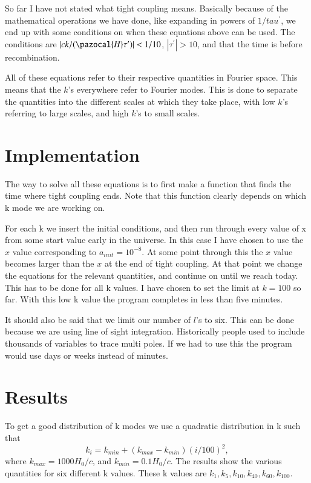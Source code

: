 \documentclass[a4paper]{report}
\begin{document}
So far I have not stated what tight coupling means. Basically because of the mathematical operations we have done, like expanding in powers of $1/tau^\prime$, we end up with some conditions on when these equations above can be used. The conditions are $|ck/(\pazocal{H}\tau^\prime)| < 1/10$, $|\tau^\prime|>10$, and that the time is before recombination.
 
All of these equations refer to their respective quantities in Fourier space. This means that the $k$'s everywhere refer to Fourier modes. This is done to separate the quantities into the different scales at which they take place, with low $k$'s referring to large scales, and high $k$'s to small scales.
 
\section{Implementation}\label{sec:Imp}
The way to solve all these equations is to first make a function that finds the time where tight coupling ends.
Note that this function clearly depends on which k mode we are working on.

For each k we insert the initial conditions, and then run through every value of x from some start value early in the universe. In this case I have chosen to use the $x$ value corresponding to $a_{init} = 10^{-8}$.
At some point through this the $x$ value becomes larger than the $x$ at the end of tight coupling. At that point we change the equations for the relevant quantities, and continue on until we reach today.
This has to be done for all k values. I have chosen to set the limit at $k=100$ so far. With this low k value the program completes in less than five minutes.

It should also be said that we limit our number of $l$'s to six. This can be done because we are using line of sight integration. Historically people used to include thousands of variables to trace multi poles. If we had to use this the program would use days or weeks instead of minutes.

\section{Results}\label{sec:results}
To get a good distribution of k modes we use a quadratic distribution in k such that
\begin{equation}
 k_i = k_{min} +(k_{max}-k_{min})(i/100)^2,
\end{equation}
where $k_{max} = 1000H_0/c$, and $k_{min} = 0.1H_0/c$.
The results show the various quantities for six different k values. These k values are $k_1,k_5,k_{10},k_{40},k_{60},k_{100}$. 
\end{document}
